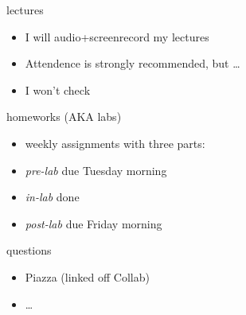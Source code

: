 

\begin{frame}{lectures}
    \begin{itemize}
    \item I will audio+screenrecord my lectures
    \item Attendence is strongly recommended, but \ldots
    \item I won't check
    \end{itemize}
\end{frame}

\begin{frame}{homeworks (AKA labs)}
    \begin{itemize}
    \item weekly assignments with three parts:
    \vspace{.5cm}
    \item \textit{pre-lab} due Tuesday morning
    \item \textit{in-lab} done 
    \item \textit{post-lab} due Friday morning
    \end{itemize}
\end{frame}

\begin{frame}{questions}
    \begin{itemize}
    \item Piazza (linked off Collab)
    \item \ldots
    \end{itemize}
\end{frame}
